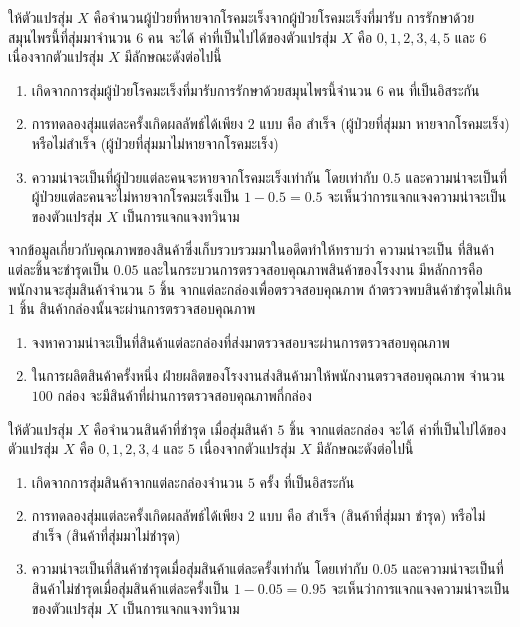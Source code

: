\solution ให้ตัวแปรสุ่ม $X$ คือจำนวนผู้ป่วยที่หายจากโรคมะเร็งจากผู้ป่วยโรคมะเร็งที่มารับ การรักษาด้วยสมุนไพรนี้ที่สุ่มมาจำนวน $6$ คน จะได้ ค่าที่เป็นไปได้ของตัวแปรสุ่ม $X$ คือ $0,1,2,3,4,5$ และ $6$ เนื่องจากตัวแปรสุ่ม $X$ มีลักษณะดังต่อไปนี้
\begin{enumerate}
	\item เกิดจากการสุ่มผู้ป่วยโรคมะเร็งที่มารับการรักษาด้วยสมุนไพรนี้จำนวน $6$ คน ที่เป็นอิสระกัน
	\item การทดลองสุ่มแต่ละครั้งเกิดผลลัพธ์ได้เพียง $2$ แบบ คือ สำเร็จ (ผู้ป่วยที่สุ่มมา หายจากโรคมะเร็ง) หรือไม่สำเร็จ (ผู้ป่วยที่สุ่มมาไม่หายจากโรคมะเร็ง)
	\item ความน่าจะเป็นที่ผู้ป่วยแต่ละคนจะหายจากโรคมะเร็งเท่ากัน โดยเท่ากับ $0.5$ และความน่าจะเป็นที่ผู้ป่วยแต่ละคนจะไม่หายจากโรคมะเร็งเป็น $1-0.5=0.5$ จะเห็นว่าการแจกแจงความน่าจะเป็นของตัวแปรสุ่ม $X$ เป็นการแจกแจงทวินาม
\end{enumerate}

\newpage
\begin{examplebox}
จากข้อมูลเกี่ยวกับคุณภาพของสินค้าซึ่งเก็บรวบรวมมาในอดีตทำให้ทราบว่า ความน่าจะเป็น ที่สินค้าแต่ละชิ้นจะชำรุดเป็น $0.05$ และในกระบวนการตรวจสอบคุณภาพสินค้าของโรงงาน มีหลักการคือพนักงานจะสุ่มสินค้าจำนวน $5$ ชิ้น จากแต่ละกล่องเพื่อตรวจสอบคุณภาพ ถ้าตรวจพบสินค้าชำรุดไม่เกิน $1$ ชิ้น สินค้ากล่องนั้นจะผ่านการตรวจสอบคุณภาพ
\begin{enumerate}[label=\arabic*), leftmargin=2.5em]
	\item จงหาความน่าจะเป็นที่สินค้าแต่ละกล่องที่ส่งมาตรวจสอบจะผ่านการตรวจสอบคุณภาพ
	\item ในการผลิตสินค้าครั้งหนึ่ง ฝ่ายผลิตของโรงงานส่งสินค้ามาให้พนักงานตรวจสอบคุณภาพ จำนวน $100$ กล่อง จะมีสินค้าที่ผ่านการตรวจสอบคุณภาพกี่กล่อง
\end{enumerate}
\end{examplebox}
\solution ให้ตัวแปรสุ่ม $X$ คือจำนวนสินค้าที่ชำรุด เมื่อสุ่มสินค้า $5$ ชิ้น จากแต่ละกล่อง จะได้ ค่าที่เป็นไปได้ของตัวแปรสุ่ม $X$ คือ $0,1,2,3,4$ และ $5$ เนื่องจากตัวแปรสุ่ม $X$ มีลักษณะดังต่อไปนี้
\begin{enumerate}[label=\arabic*., leftmargin=2.5em]
	\item เกิดจากการสุ่มสินค้าจากแต่ละกล่องจำนวน $5$ ครั้ง ที่เป็นอิสระกัน
	\item การทดลองสุ่มแต่ละครั้งเกิดผลลัพธ์ได้เพียง $2$ แบบ คือ สำเร็จ (สินค้าที่สุ่มมา ชำรุด) หรือไม่สำเร็จ (สินค้าที่สุ่มมาไม่ชำรุด)
	\item ความน่าจะเป็นที่สินค้าชำรุดเมื่อสุ่มสินค้าแต่ละครั้งเท่ากัน โดยเท่ากับ $0.05$ และความน่าจะเป็นที่สินค้าไม่ชำรุดเมื่อสุ่มสินค้าแต่ละครั้งเป็น $1-0.05=0.95$ จะเห็นว่าการแจกแจงความน่าจะเป็นของตัวแปรสุ่ม $X$ เป็นการแจกแจงทวินาม
\end{enumerate}

